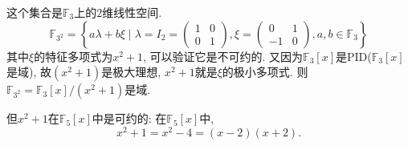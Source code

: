\begin{solution}
    这个集合是$\mathbb{F}_3$上的$2$维线性空间.
\[
    \mathbb{F}_{3^2} = \left\{ a\lambda + b\xi \mid
    \lambda = I_2 = 
    \begin{pmatrix}
        1 & 0\\
        0 & 1
    \end{pmatrix},
    \xi = 
    \begin{pmatrix} 
        0 & 1\\
        -1 & 0
    \end{pmatrix}, a, b \in \mathbb{F}_3 \right\}
\]
其中$\xi$的特征多项式为$x^2 + 1$, 可以验证它是不可约的. 又因为$\mathbb{F}_3[x]$是PID($\mathbb{F}_3[x]$是域), 故$(x^2 + 1)$是极大理想, $x^2 + 1$就是$\xi$的极小多项式. 则$\mathbb{F}_{3^2} = \mathbb{F}_3[x]/(x^2 + 1)$是域.

但$x^2 + 1$在$\mathbb{F}_5[x]$中是可约的: 在$\mathbb{F}_5[x]$中, 
\[
    x^2 + 1 = x^2 - 4 = (x - 2)(x + 2).
\]
\end{solution}